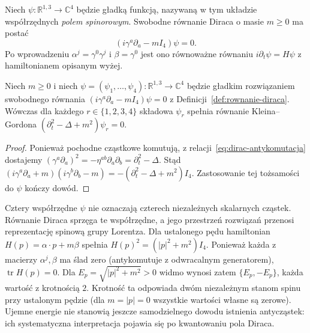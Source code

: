 \begin{definicja}
\label{def:rownanie-diraca}
Niech $\psi:\mathbb R^{1,3}\to\mathbb C^4$ będzie gładką
funkcją, nazywaną w tym układzie współrzędnych
\emph{polem spinorowym}. Swobodne równanie Diraca
o masie $m\geq0$ ma postać
\begin{equation}\label{eq:dirac-minkowski}
 (i\gamma^a\partial_a-mI_4)\psi=0.
\end{equation}
Po wprowadzeniu $\alpha^j=\gamma^0\gamma^j$
i $\beta=\gamma^0$ jest ono równoważne równaniu
$i\partial_t\psi=H\psi$ z hamiltonianem opisanym wyżej.
\end{definicja}

\begin{stwierdzenie}
\label{prop:dirac-kwadrat}
Niech $m\geq0$ i niech
$\psi=(\psi_1,\ldots,\psi_4):\mathbb R^{1,3}\to\mathbb C^4$
będzie gładkim rozwiązaniem swobodnego równania
$ (i\gamma^a\partial_a-mI_4)\psi=0$ z
Definicji~\ref{def:rownanie-diraca}.
Wówczas dla każdego $r\in\{1,2,3,4\}$ składowa
$\psi_r$ spełnia równanie Kleina--Gordona
$(\partial_t^2-\Delta+m^2)\psi_r=0$.
\end{stwierdzenie}
\begin{proof}
Ponieważ pochodne cząstkowe komutują, z
relacji~\eqref{eq:dirac-antykomutacja} dostajemy
$(\gamma^a\partial_a)^2
=-\eta^{ab}\partial_a\partial_b=\partial_t^2-\Delta$.
Stąd
$(i\gamma^a\partial_a+m)(i\gamma^b\partial_b-m)
=-(\partial_t^2-\Delta+m^2)I_4$.
Zastosowanie tej tożsamości do $\psi$ kończy dowód.
\end{proof}

\begin{uwaga}
Cztery współrzędne $\psi$ nie oznaczają czterech
niezależnych skalarnych cząstek. Równanie Diraca sprzęga
te współrzędne, a jego przestrzeń rozwiązań przenosi
reprezentację spinową grupy Lorentza.
Dla ustalonego pędu hamiltonian $H(p)=\alpha\cdot p+m\beta$
spełnia $H(p)^2=(|p|^2+m^2)I_4$.
Ponieważ każda z macierzy $\alpha^j,\beta$ ma ślad zero
(antykomutuje z odwracalnym generatorem),
$\operatorname{tr}H(p)=0$. Dla
$E_p=\sqrt{|p|^2+m^2}>0$ widmo wynosi zatem
$\{E_p,-E_p\}$, każda wartość z krotnością $2$.
Krotność ta odpowiada dwóm niezależnym stanom spinu
przy ustalonym pędzie (dla $m=|p|=0$ wszystkie
wartości własne są zerowe).
Ujemne energie nie stanowią jeszcze samodzielnego
dowodu istnienia antycząstek: ich systematyczna
interpretacja pojawia się po kwantowaniu pola Diraca.
\end{uwaga}

